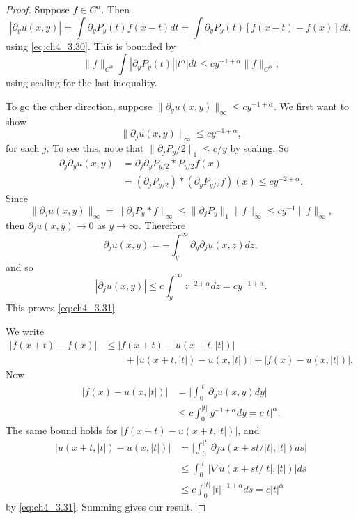 \begin{proof}
Suppose $f \in C^\alpha$. Then
\[
    |\partial_y u(x,y)| = \int \partial_y P_y(t)f(x-t)dt = \int \partial_y P_y(t)[f(x-t)-f(x)]dt,
\]
using \eqref{eq:ch4_3.30}. This is bounded by
\[
    \|f\|_{C^\alpha} \int |\partial_y P_y(t)||t^\alpha| dt \leq cy^{-1+\alpha}\|f\|_{C^\alpha},
\]
using scaling for the last inequality.

To go the other direction, suppose $\|\partial_y u(x,y)\|_\infty \leq cy^{-1+\alpha}$. We first want to show
\begin{equation}\label{eq:ch4_3.31}
    \|\partial_j u(x,y)\|_\infty \leq cy^{-1+\alpha},
\end{equation}
for each $j$. To see this, note that $\|\partial_j P_y/2\|_1 \leq c/y$ by scaling. So
\begin{align*}
    \partial_j\partial_y u(x,y) &= \partial_j\partial_y P_{y/2} * P_{y/2}f(x) \\
    &= (\partial_j P_{y/2}) * (\partial_y P_{y/2}f)(x) \leq cy^{-2+\alpha}.
\end{align*}
Since
\[
    \|\partial_j u(x,y)\|_\infty = \|\partial_j P_y * f\|_\infty \leq \|\partial_j P_y\|_1\|f\|_\infty \leq cy^{-1}\|f\|_\infty,
\]
then $\partial_j u(x,y) \to 0$ as $y \to \infty$. Therefore
\[
    \partial_j u(x,y) = -\int_y^\infty \partial_y\partial_j u(x,z)dz,
\]
and so
\[
    |\partial_j u(x,y)| \leq c\int_y^\infty z^{-2+\alpha}dz = cy^{-1+\alpha}.
\]
This proves \eqref{eq:ch4_3.31}.

We write
\begin{align*}
    \big|f(x+t)-f(x)\big| &\leq \big|f(x+t)-u(x+t,|t|)\big| \\
    &\qquad+ \big|u(x+t,|t|)-u(x,|t|)\big| + \big|f(x)-u(x,|t|)\big|.
\end{align*}
Now
\begin{align*}
    \big|f(x)-u(x,|t|)\big| &= \Big|\int_0^{|t|} \partial_y u(x,y)dy\Big| \\
    &\leq c\int_0^{|t|} y^{-1+\alpha}dy = c|t|^\alpha.
\end{align*}
\mnewpage
The same bound holds for $|f(x+t)-u(x+t,|t|)|$, and
\begin{align*}
    \big|u(x+t,|t|)-u(x,|t|)\big| &= \Big|\int_0^{|t|} \partial_j u(x+st/|t|,|t|) ds\Big| \\
    &\leq \int_0^{|t|} \big|\nabla u(x+st/|t|,|t|)\big|ds \\
    &\leq c\int_0^{|t|} |t|^{-1+\alpha}ds= c|t|^{\alpha}
\end{align*}
by \eqref{eq:ch4_3.31}. Summing gives our result.
\end{proof}

